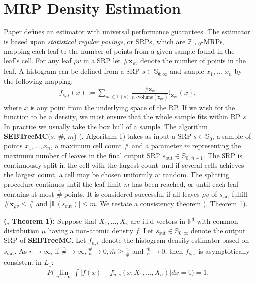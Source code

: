 \documentclass{report}
\begin{document}
\section{MRP Density Estimation}
Paper \cite{MDE} defines an estimator with universal performance guarantees. The estimator is based upon \textit{statistical regular pavings}, or SRPs, which are $\mathbb{Z}_{\geq 0}$-MRPs, mapping each leaf 
to the number of points from a given sample found in the leaf's cell. For any leaf $\rho v$ in a SRP let $\#\mathbf{x}_{\rho v}$ denote the number of points in the leaf.
A histogram can be defined from a SRP $s\in \mathbb{S}_{0:\infty}$ and sample $x_1,\dots,x_n$ by the following mapping:
\begin{align*}
	f_{n,s}(x) := \sum_{\rho v \in \mathbb{L}(s)} \frac{\#\mathbf{x}_{\rho v}}{n\cdot \text{volume}(\mathbf{x}_{\rho v})}\mathbb{I}_{\mathbf{x}_{\rho v}}(x),
\end{align*}
where $x$ is any point from the underlying space of the RP. If we wish for the function to be a density, we must ensure that the whole sample fits within RP $s$. In practice we usually take the box hull of a sample.
The algorithm \textbf{SEBTreeMC}($s$, $\overline{\#}$, $\overline{m}$) (\cite{MDE}, Algorithm 1) takes as input a SRP $s \in \mathbb{S}_0$, a sample of points $x_1,\dots,x_n$,
a maximum cell count $\overline{\#}$ and a parameter $\overline{m}$ representing the maximum number of leaves in the final output SRP $s_{\text{out}} \in \mathbb{S}_{0:\overline{m}-1}$. The SRP is continuously split in
the cell with the largest count, and if several cells achieves the largest count, a cell may be chosen uniformly at random. The splitting procedure continues until 
the leaf limit  $\overline{m}$ has been reached, or until each leaf contains at most $\overline{\#}$ points. It is considered successful if all leaves $\rho v$ of $s_{\text{out}}$
fulfill $\#\mathbf{x}_{\rho v} \leq \overline{\#}$ and $|\mathbb{L}(s_\text{out})| \leq \overline{m}$. We restate a consistency theorem (\cite{MDE}, Theorem 1).\newline

\noindent\textbf{(\cite{MDE}, Theorem 1): }
Suppose that $X_1,\dots,X_n$ are i.i.d vectors in $\mathbb{R}^d$ with common distribution $\mu$ having a non-atomic density $f$. Let $s_\text{out} \in \mathbb{S}_{0:\infty}$ denote the output SRP 
of \textbf{SEBTreeMC}. Let $f_{n,s}$ denote the histogram density estimator based on $s_\text{out}$. As $n \rightarrow \infty$, if $\overline{\#} \rightarrow \infty,
\frac{\overline{\#}}{n} \rightarrow 0, \overline{m} \geq \frac{n}{\overline{\#}}$
and $\frac{\overline{m}}{n} \rightarrow 0$, then $f_{n,s}$ is asymptotically consistent in $L_1$:
\begin{align*}
	P\bigg(\lim_{n\rightarrow \infty} \int \big| f(x) - f_{n,s}(x;X_1,\dots,X_n) \big|dx = 0\bigg) = 1.
\end{align*}
\newline
\end{document}
